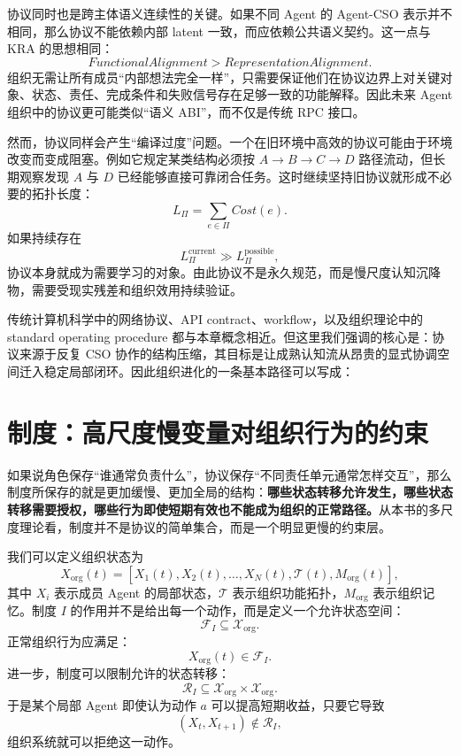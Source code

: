协议同时也是跨主体语义连续性的关键。如果不同 Agent 的 Agent-CSO 表示并不相同，那么协议不能依赖内部 latent 一致，而应依赖公共语义契约。这一点与 KRA 的思想相同：
\[
\boxed{
FunctionalAlignment
>
RepresentationAlignment.
}
\]
组织无需让所有成员“内部想法完全一样”，只需要保证他们在协议边界上对关键对象、状态、责任、完成条件和失败信号存在足够一致的功能解释。因此未来 Agent 组织中的协议更可能类似“语义 ABI”，而不仅是传统 RPC 接口。

然而，协议同样会产生“编译过度”问题。一个在旧环境中高效的协议可能由于环境改变而变成阻塞。例如它规定某类结构必须按 $A\rightarrow B\rightarrow C\rightarrow D$ 路径流动，但长期观察发现 $A$ 与 $D$ 已经能够直接可靠闭合任务。这时继续坚持旧协议就形成不必要的拓扑长度：
\[
L_{\Pi}
=
\sum_{e\in\Pi}
Cost(e).
\]
如果持续存在
\[
L_{\Pi}^{\mathrm{current}}
\gg
L_{\Pi}^{\mathrm{possible}},
\]
协议本身就成为需要学习的对象。由此协议不是永久规范，而是慢尺度认知沉降物，需要受现实残差和组织效用持续验证。

传统计算机科学中的网络协议、API contract、workflow，以及组织理论中的 standard operating procedure 都与本章概念相近。但这里我们强调的核心是：协议来源于反复 CSO 协作的结构压缩，其目标是让成熟认知流从昂贵的显式协调空间迁入稳定局部闭环。因此组织进化的一条基本路径可以写成：
\begin{statementbox}
\centering
{}
\end{statementbox}


\section{制度：高尺度慢变量对组织行为的约束}
\label{sec:institution}

如果说角色保存“谁通常负责什么”，协议保存“不同责任单元通常怎样交互”，那么制度所保存的就是更加缓慢、更加全局的结构：\textbf{哪些状态转移允许发生，哪些状态转移需要授权，哪些行为即使短期有效也不能成为组织的正常路径。}从本书的多尺度理论看，制度并不是协议的简单集合，而是一个明显更慢的约束层。

我们可以定义组织状态为
\[
X_{\mathrm{org}}(t)
=
\left[
X_1(t),
X_2(t),
\ldots,
X_N(t),
\mathcal T(t),
M_{\mathrm{org}}(t)
\right],
\]
其中 $X_i$ 表示成员 Agent 的局部状态，$\mathcal T$ 表示组织功能拓扑，$M_{\mathrm{org}}$ 表示组织记忆。制度 $I$ 的作用并不是给出每一个动作，而是定义一个允许状态空间：
\[
\mathcal F_I
\subseteq
\mathcal X_{\mathrm{org}}.
\]
正常组织行为应满足：
\[
X_{\mathrm{org}}(t)\in\mathcal F_I.
\]
进一步，制度可以限制允许的状态转移：
\[
\mathcal R_I
\subseteq
\mathcal X_{\mathrm{org}}\times\mathcal X_{\mathrm{org}}.
\]
于是某个局部 Agent 即使认为动作 $a$ 可以提高短期收益，只要它导致
\[
(X_t,X_{t+1})\notin\mathcal R_I,
\]
组织系统就可以拒绝这一动作。

